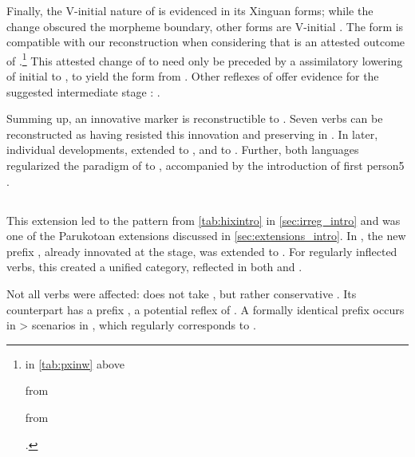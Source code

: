 Finally, the V-initial nature of \PPek {} is evidenced in its Xinguan forms; while the \bakairi change  obscured the morpheme boundary, other forms are V-initial .
The \ikpeng form  is compatible with our reconstruction  when considering that \ikpeng {} is an attested outcome of .\footnote{\begin{inlinelist}
 \item {}  in \cref{tab:pxinw} above
 \item {}  \parencite[24]{ikpengpacheco2001} from \PC {} \parencite[12]{gildea2007greenberg}
 \item {}  \parencite[98]{ikpengpacheco2001} from \PC {}
 \end{inlinelist}.}
This attested change of  to  need only be preceded by a assimilatory lowering of initial  to , to yield the form  from .
Other \ikpeng reflexes of  offer evidence for the suggested intermediate stage :   \parencite[25]{ikpengpacheco2001}.

Summing up, an innovative  marker  is reconstructible to \PPek.
Seven verbs can be reconstructed as having resisted this innovation and preserving   in \PPek.
In later, individual developments, \bakairi extended  to , and \ikpeng to .
Further, both languages regularized the paradigm of  to , accompanied by the introduction of first person5 .

\subsection{\PWai {}}
\label{sec:waiwaian}
This extension led to the \hixka pattern from \cref{tab:hixintro} in \cref{sec:irreg_intro} and was one of the Parukotoan extensions discussed in \cref{sec:extensions_intro}.
In \PWai, the new  prefix , already innovated at the \PPar stage, was extended to .
For regularly inflected verbs, this created a unified  category, reflected in both \hixka and \waiwai {}.

Not all  verbs were affected: \waiwai {}  does not take , but rather conservative  .
Its \hixka counterpart has a prefix  , a potential reflex of  .
A formally identical prefix occurs in > scenarios in \hixka {}, which regularly corresponds to \waiwai {} .


